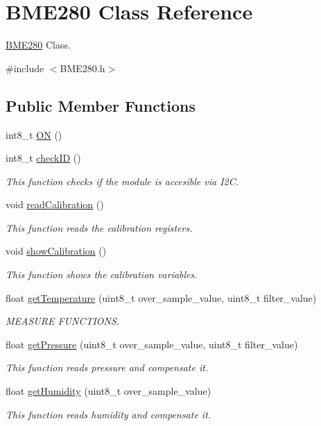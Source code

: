 \hypertarget{class_b_m_e280}{}\section{B\+M\+E280 Class Reference}
\label{class_b_m_e280}


\hyperlink{class_b_m_e280}{B\+M\+E280} Class.  




{\ttfamily \#include $<$B\+M\+E280.\+h$>$}

\subsection*{Public Member Functions}
\begin{DoxyCompactItemize}
\item 
int8\+\_\+t \hyperlink{class_b_m_e280_a01754b06e80a1a2234c61fd61cc56208}{ON} ()
\item 
int8\+\_\+t \hyperlink{class_b_m_e280_aa7ba7da85cdcf814ad03b487a16ccffe}{check\+ID} ()
\begin{DoxyCompactList}\small\item\em This function checks if the module is accesible via I2C. \end{DoxyCompactList}\item 
void \hyperlink{class_b_m_e280_ae611569bcd7acf70b1a4bbf23bce6b4b}{read\+Calibration} ()
\begin{DoxyCompactList}\small\item\em This function reads the calibration registers. \end{DoxyCompactList}\item 
void \hyperlink{class_b_m_e280_aa4567ab625ccd9d79758afd4fd1ec6bc}{show\+Calibration} ()
\begin{DoxyCompactList}\small\item\em This function shows the calibration variables. \end{DoxyCompactList}\item 
float \hyperlink{class_b_m_e280_a10aab08dcec4989c247c57306a1ad3e8}{get\+Temperature} (uint8\+\_\+t over\+\_\+sample\+\_\+value, uint8\+\_\+t filter\+\_\+value)
\begin{DoxyCompactList}\small\item\em M\+E\+A\+S\+U\+RE F\+U\+N\+C\+T\+I\+O\+NS. \end{DoxyCompactList}\item 
float \hyperlink{class_b_m_e280_a910b290ae7bd11fd27afd8265bdc9203}{get\+Pressure} (uint8\+\_\+t over\+\_\+sample\+\_\+value, uint8\+\_\+t filter\+\_\+value)
\begin{DoxyCompactList}\small\item\em This function reads pressure and compensate it. \end{DoxyCompactList}\item 
float \hyperlink{class_b_m_e280_a17a7b923ef6bf7165e8bcb23256a975d}{get\+Humidity} (uint8\+\_\+t over\+\_\+sample\+\_\+value)
\begin{DoxyCompactList}\small\item\em This function reads humidity and compensate it. \end{DoxyCompactList}\end{DoxyCompactItemize}


